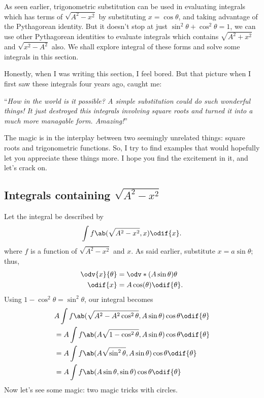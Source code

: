 As seen earlier, trigonometric substitution can be used in evaluating integrals which has terms of $\sqrt{A^2 - x^2}$ by substituting $x = \cos\theta$, and taking advantage of the Pythagorean identity. But it doesn't stop at just $\sin^2\theta + \cos^2\theta = 1$, we can use other Pythagorean identities to evaluate integrals which contains $\sqrt{A^2 + x^2}$ and $\sqrt{x^2 - A^2}$ also. We shall explore integral of these forms and solve some integrals in this section.

Honestly, when I was writing this section, I feel bored. But that picture when I first saw these integrals four years ago, caught me:
\begin{displayquote}
	\enquote{\emph{How in the world is it possible? A simple substitution could do such wonderful things! It just destroyed this integrals involving square roots and turned it into a much more managable form. Amazing!}}
\end{displayquote}
The magic is in the interplay between two seemingly unrelated things: square roots and trigonometric functions. So, I try to find examples that would hopefully let you appreciate these things more. I hope you find the excitement in it, and let's crack on.

\subsection*{Integrals containing $\sqrt{A^2 - x^2}$}

Let the integral be described by
\begin{equation}
	\int f\ab(\sqrt{A^2 - x^2}, x)\odif{x}.
\end{equation}
where $f$ is a function of $\sqrt{A^2 - x^2}$ and $x$. As said earlier, substitute $x = a\sin\theta$; thus,
\begin{align}
	\odv{x}{\theta} & = \odv*{(A\sin\theta)}{\theta} \\
	\odif{x}        & = A\cos(\theta)\odif{\theta}.
\end{align}
Using $1 - \cos^2\theta = \sin^2\theta$, our integral becomes
\begin{align}
	 & A\int f\ab(\sqrt{A^2 - A^2\cos^2\theta}, A\sin\theta)\cos\theta\odif{\theta} \nonumber \\
	 & = A\int f\ab(A\sqrt{1 - \cos^2\theta}, A\sin\theta)\cos\theta\odif{\theta}             \\
	 & = A\int f\ab(A\sqrt{\sin^2\theta}, A\sin\theta)\cos\theta\odif{\theta}                 \\
	 & = A\int f\ab(A\sin\theta, \sin\theta)\cos\theta\odif{\theta}
\end{align}
Now let's see some magic: two magic tricks with circles.

